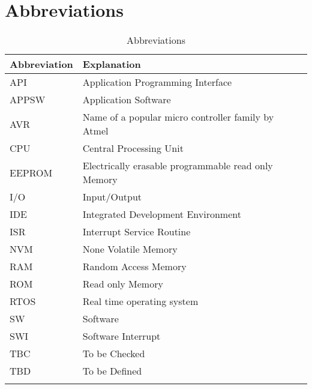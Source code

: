 \chapter{Abbreviations}
\label{secAbbreviations}

\begin{longtable}[c]{|l|l|}
\hline
Abbreviation & Explanation
\\ \hline
API	    & Application Programming Interface                    \\ \hline
APPSW	  & Application Software                                 \\ \hline
AVR     & Name of a popular micro controller family by Atmel   \\ \hline
CPU     & Central Processing Unit                              \\ \hline
EEPROM	& Electrically erasable programmable read only Memory  \\ \hline
I/O	    & Input/Output                                         \\ \hline
IDE	    & Integrated Development Environment                   \\ \hline
ISR	    & Interrupt Service Routine                            \\ \hline
NVM     & None Volatile Memory                                 \\ \hline
RAM	    & Random Access Memory                                 \\ \hline
ROM	    & Read only Memory                                     \\ \hline
RTOS    & Real time operating system                           \\ \hline
SW	    & Software                                             \\ \hline
SWI	    & Software Interrupt                                   \\ \hline
TBC	    & To be Checked                                        \\ \hline
TBD	    & To be Defined                                        \\ \hline
\caption{Abbreviations} \label{tabAbbrev}
\end{longtable}
